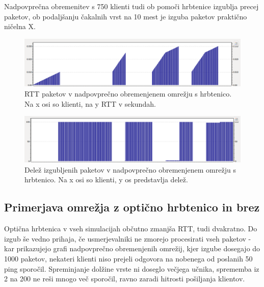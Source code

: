 \documentclass[11pt, a4paper, slovene]{book}
\begin{document}
\pagebreak

Nadpovprečna obremenitev s 750 klienti tudi ob pomoči hrbtenice izgublja precej paketov, ob podaljšanju čakalnih vrst na 10 mest je izguba paketov praktično ničelna X.

\begin{figure}[h]
	\centering
	\includegraphics[width=\textwidth]{hRtt2.png}
	\caption{RTT paketov v nadpovprečno obremenjenem omrežju s hrbtenico. Na x osi so klienti, na y RTT v sekundah.}
	\label{RTT6}	
\end{figure}

\begin{figure}[h]
	\centering
	\includegraphics[width=\textwidth]{hLoss2.png}
	\caption{Delež izgubljenih paketov v nadpovprečno obremenjenem omrežju s hrbtenico. Na x osi so klienti, y os predstavlja delež.}
	\label{hPL2}	
\end{figure}

\subsection{Primerjava omrežja z optično hrbtenico in brez} 
Optična hrbtenica v vseh simulacijah občutno zmanjša RTT, tudi dvakratno. Do izgub še vedno prihaja, če usmerjevalniki ne zmorejo procesirati vseh paketov - kar prikazujejo grafi nadpovprečno obremenjenih omrežij, kjer izgube dosegajo do 1000 paketov, nekateri klienti niso prejeli odgovora na nobenega od poslanih 50 ping sporočil. Spreminjanje dolžine vrste ni doseglo večjega učnika, sprememba iz 2 na 200 ne reši mnogo več sporočil, ravno zaradi hitrosti pošiljanja klientov.
\end{document}
